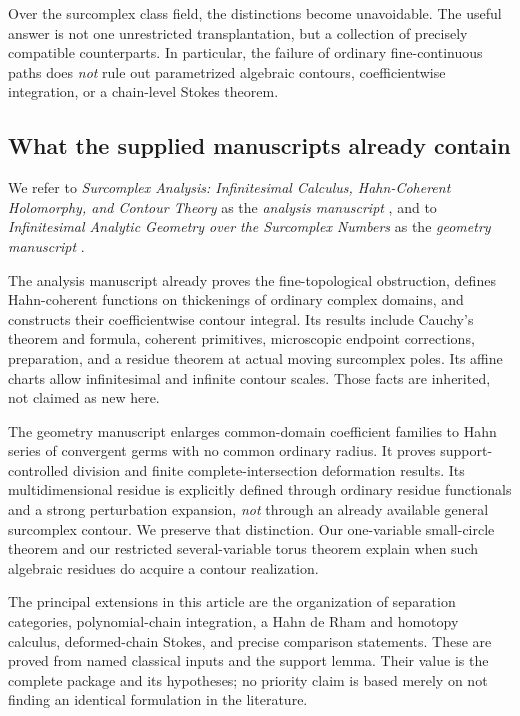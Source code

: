 \documentclass[11pt,letterpaper]{article}
\theoremstyle{definition}
\theoremstyle{remark}
\numberwithin{equation}{section}
\begin{document}
Over the surcomplex class field, the distinctions become unavoidable. The useful answer is not one unrestricted transplantation, but a collection of precisely compatible counterparts. In particular, the failure of ordinary fine-continuous paths does \emph{not} rule out parametrized algebraic contours, coefficientwise integration, or a chain-level Stokes theorem.

\subsection{What the supplied manuscripts already contain}
We refer to \emph{Surcomplex Analysis: Infinitesimal Calculus, Hahn-Coherent Holomorphy, and Contour Theory} as the \emph{analysis manuscript} \cite{Analysis}, and to \emph{Infinitesimal Analytic Geometry over the Surcomplex Numbers} as the \emph{geometry manuscript} \cite{Geometry}.

The analysis manuscript already proves the fine-topological obstruction, defines Hahn-coherent functions on thickenings of ordinary complex domains, and constructs their coefficientwise contour integral. Its results include Cauchy's theorem and formula, coherent primitives, microscopic endpoint corrections, preparation, and a residue theorem at actual moving surcomplex poles. Its affine charts allow infinitesimal and infinite contour scales. Those facts are inherited, not claimed as new here.

The geometry manuscript enlarges common-domain coefficient families to Hahn series of convergent germs with no common ordinary radius. It proves support-controlled division and finite complete-intersection deformation results. Its multidimensional residue is explicitly defined through ordinary residue functionals and a strong perturbation expansion, \emph{not} through an already available general surcomplex contour. We preserve that distinction. Our one-variable small-circle theorem and our restricted several-variable torus theorem explain when such algebraic residues do acquire a contour realization.

The principal extensions in this article are the organization of separation categories, polynomial-chain integration, a Hahn de Rham and homotopy calculus, deformed-chain Stokes, and precise comparison statements. These are proved from named classical inputs and the support lemma. Their value is the complete package and its hypotheses; no priority claim is based merely on not finding an identical formulation in the literature.
\end{document}
